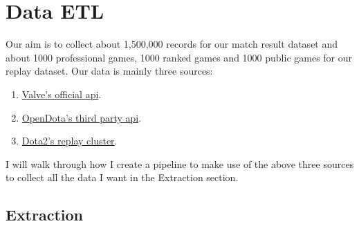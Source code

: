 \documentclass{article}
\begin{document}
\section{Data ETL}
Our aim is to collect about 1,500,000 records for our match result dataset and about 1000 professional games, 1000 ranked games and 1000 public games for our replay dataset. Our data is mainly three sources:
\begin{enumerate}
\item \href{https://wiki.teamfortress.com/wiki/WebAPI/}{Valve's official api}.
\item \href{https://docs.opendota.com/}{OpenDota's third party api}.
\item \href{https://dev.dota2.com/showthread.php?t=47115}{Dota2's replay cluster}.
\end{enumerate}
    I will walk through how I create a pipeline to make use of the above three sources to collect all the data I want in the Extraction section. \\
\subsection{Extraction}
\end{document}
